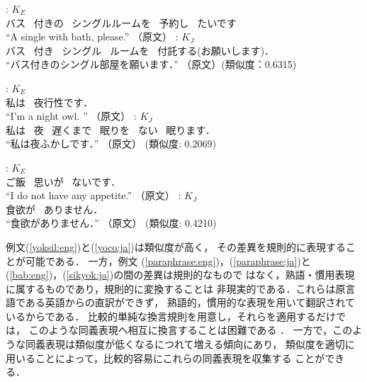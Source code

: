  \begin{exe}
\ex
\begin{xlist}
\ex\label{yoksil:eng} \gll
{}    
: $K_E$\\
バス~ 付きの~ シングルルームを~ 予約し~ たいです 　\\
   \trans ``A single with bath, please.'' （原文）
\ex\label{yoco:ja} \gll
{}    : $K_J$\\
バス~ 付き~ シングル~ ルームを~ 付託する(お願いします)． 　\\
  \trans ``バス付きのシングル部屋を願います．'' （原文）\hfill (類似度：0.6315)
 \end{xlist}
\ex
\begin{xlist}
  \ex\label{paraphrase:eng} \gll
  : $K_E$\\
私は~ 夜行性です． 　\\
      \trans    ``I'm a night owl.  '' （原文）
  \ex\label{paraphrase:ja} \gll
{}     : $K_J$\\
私は~ 夜~ 遅くまで~  眠りを~ ない~ 眠ります． 　\\
      \trans    ``私は夜ふかしです．'' （原文） \hfill (類似度: 0.2069)
\end{xlist}
\ex
\begin{xlist}
\ex\label{bab:eng} \gll
{}  : $K_E$\\
ご飯~ 思いが~ ないです． 　\\
 \trans ``I do not have any appetite.''  （原文）
\ex\label{sikyok:ja}\gll
{} : $K_J$\\
食欲が~ ありません． 　\\
  \trans ``食欲がありません．'' （原文）
\hfill (類似度: 0.4210)
\end{xlist}
\end{exe} 

例文(\ref{yoksil:eng})と(\ref{yoco:ja})は類似度が高く，
その差異を規則的に表現することが可能である．
一方，例文
(\ref{paraphrase:eng})，(\ref{paraphrase:ja})と(\ref{bab:eng})，(\ref{sikyok:ja})の間の差異は規則的なもので
はなく，熟語・慣用表現に属するものであり，規則的に変換することは
非現実的である．これらは原言語である英語からの直訳ができず，
熟語的，慣用的な表現を用いて翻訳されているからである．
比較的単純な換言規則を用意し，それらを適用するだけでは，
このような同義表現へ相互に換言することは困難である
\cite{Ohtake:Yamamoto:2001}．
一方で，このような同義表現は類似度が低くなるにつれて増える傾向にあり，
類似度を適切に用いることによって，比較的容易にこれらの同義表現を収集する
ことができる．

